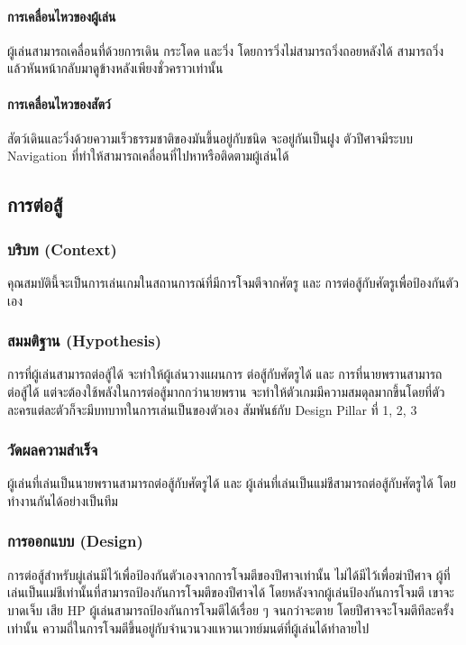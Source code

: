 \paragraph{การเคลื่อนไหวของผู้เล่น}

ผู้เล่นสามารถเคลื่อนที่ด้วยการเดิน กระโดด และวิ่ง โดยการวิ่งไม่สามารถวิ่งถอยหลังได้ สามารถวิ่งแล้วหันหน้ากลับมาดูข้างหลังเพียงชั่วคราวเท่านั้น

\paragraph{การเคลื่อนไหวของสัตว์}

สัตว์เดินและวิ่งด้วยความเร็วธรรมชาติของมันขึ้นอยู่กับชนิด จะอยู่กันเป็นฝูง ตัวปีศาจมีระบบ Navigation ที่ทำให้สามารถเคลื่อนที่ไปหาหรือติดตามผู้เล่นได้

\subsection{การต่อสู้}

\subsubsection{บริบท (Context)}
คุณสมบัตินี้จะเป็นการเล่นเกมในสถานการณ์ที่มีการโจมตีจากศัตรู และ การต่อสู้กับศัตรูเพื่อป้องกันตัวเอง 

\subsubsection{สมมติฐาน (Hypothesis)}
การที่ผู้เล่นสามารถต่อสู้ได้ จะทำให้ผู้เล่นวางแผนการ ต่อสู้กับศัตรูได้ และ การที่นายพรานสามารถต่อสู้ได้ แต่จะต้องใช้พลังในการต่อสู้มากกว่านายพราน จะทำให้ตัวเกมมีความสมดุลมากขึ้นโดยที่ตัวละครแต่ละตัวก็จะมีบทบาทในการเล่นเป็นของตัวเอง สัมพันธ์กับ Design Pillar ที่ 1, 2, 3

\subsubsection{วัดผลความสำเร็จ}
ผู้เล่นที่เล่นเป็นนายพรานสามารถต่อสู้กับศัตรูได้ และ ผู้เล่นที่เล่นเป็นแม่ชีสามารถต่อสู้กับศัตรูได้ โดยทำงานกันได้อย่างเป็นทีม

\subsubsection{การออกแบบ (Design)}

การต่อสู้สำหรับผู่เล่นมีไว้เพื่อป้องกันตัวเองจากการโจมตีของปีศาจเท่านั้น ไม่ได้มีไว้เพื่อฆ่าปีศาจ ผู้ที่เล่นเป็นแม่ชีเท่านั้นที่สามารถป้องกันการโจมตีของปีศาจได้ โดยหลังจากผู้เล่นป้องกันการโจมตี เขาจะบาดเจ็บ เสีย HP ผู้เล่นสามารถป้องกันการโจมตีได้เรื่อย ๆ จนกว่าจะตาย โดยปีศาจจะโจมตีทีละครั้งเท่านั้น ความถี่ในการโจมตีขึ้นอยู่กับจำนวนวงแหวนเวทย์มนต์ที่ผู้เล่นได้ทำลายไป

